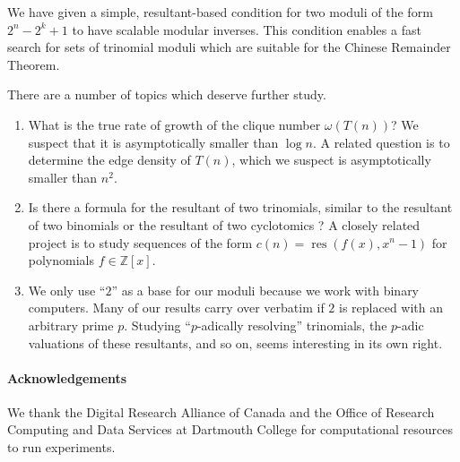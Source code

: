 \documentclass[]{article}
\theoremstyle{definition}
\DeclareMathOperator{\res}{res}
\begin{document}
We have given a simple, resultant-based condition for two moduli of the form
$2^n - 2^k + 1$ to have scalable modular inverses. This condition enables a fast
search for sets of trinomial moduli which are suitable for the Chinese Remainder
Theorem.

There are a number of topics which deserve further study.

\begin{enumerate}
    \item What is the true rate of growth of the clique number $\omega(T(n))$? We suspect that it is asymptotically smaller than $\log n$. A related question is to determine the edge density of $T(n)$, which we suspect is asymptotically smaller than $n^2$.
    \item Is there a formula for the resultant of two trinomials, similar to the
    resultant of two binomials or the resultant of two cyclotomics
    \cite{apostol}? A closely related project is to study sequences of the form
    $c(n) = \res(f(x), x^n - 1)$ for polynomials $f \in \mathbb{Z}[x]$.
    \item We only use ``$2$'' as a base for our moduli because we work with
    binary computers. Many of our results carry over verbatim if $2$ is replaced
    with an arbitrary prime $p$. Studying ``$p$-adically resolving'' trinomials,
    the $p$-adic valuations of these resultants, and so on, seems interesting in
    its own right.
\end{enumerate}

\paragraph{Acknowledgements} We thank the Digital Research Alliance of Canada
and the Office of Research Computing and Data Services at Dartmouth College for
computational resources to run experiments.

\printbibliography
\end{document}
